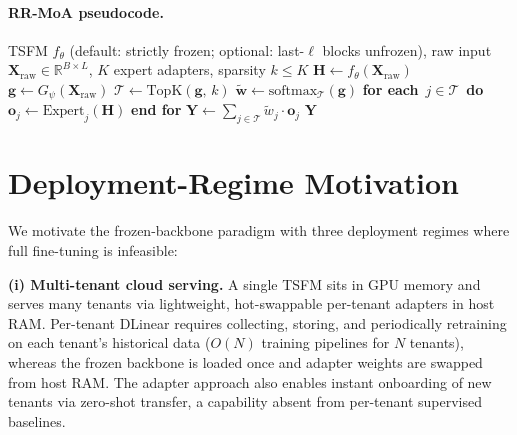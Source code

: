 \documentclass{article}
\begin{document}
\paragraph{RR-MoA pseudocode.}
\begin{algorithm}[h]
\caption{RR-MoA: Raw-Routed Mixture of Adapters with Top-$k$ sparse routing}
\label{alg:rrmoa}
\begin{algorithmic}[1]
\REQUIRE TSFM $f_\theta$ (default: strictly frozen; optional: last-$\ell$ blocks unfrozen), raw input $\mathbf{X}_\text{raw}\in\mathbb{R}^{B\times L}$, $K$ expert adapters, sparsity $k\leq K$
\STATE $\mathbf{H}\leftarrow f_\theta(\mathbf{X}_\text{raw})$ \hfill {}
\STATE $\mathbf{g}\leftarrow G_\psi(\mathbf{X}_\text{raw})$ \hfill {}
\STATE $\mathcal{T}\leftarrow \mathrm{TopK}(\mathbf{g},\,k)$ \hfill {}
\STATE $\widetilde{\mathbf{w}}\leftarrow \mathrm{softmax}_{\mathcal{T}}(\mathbf{g})$ \hfill {}
\STATE \textbf{for each}\ $j \in \mathcal{T}$\ \textbf{do}
\STATE \quad $\mathbf{o}_j\leftarrow \text{Expert}_j(\mathbf{H})$ \hfill {}
\STATE \textbf{end for}
\STATE $\mathbf{Y}\leftarrow \sum_{j\in\mathcal{T}}\widetilde{w}_j\cdot \mathbf{o}_j$
\RETURN $\mathbf{Y}$
\end{algorithmic}
\end{algorithm}

\section{Deployment-Regime Motivation}
\label{app:deployment}

We motivate the frozen-backbone paradigm with three deployment regimes where full fine-tuning is infeasible:

\textbf{(i) Multi-tenant cloud serving.} A single TSFM sits in GPU memory and serves many tenants via lightweight, hot-swappable per-tenant adapters in host RAM. Per-tenant DLinear requires collecting, storing, and periodically retraining on each tenant's historical data ($O(N)$ training pipelines for $N$ tenants), whereas the frozen backbone is loaded once and adapter weights are swapped from host RAM. The adapter approach also enables instant onboarding of new tenants via zero-shot transfer, a capability absent from per-tenant supervised baselines.
\end{document}
